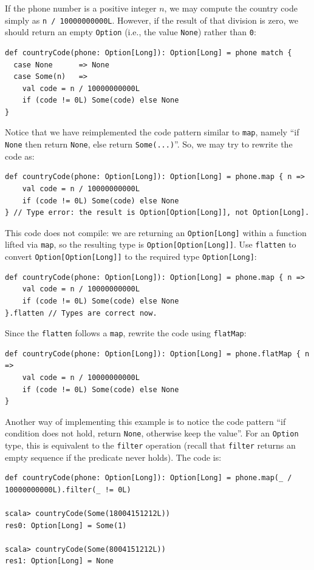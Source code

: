 If the phone number is a positive integer $n$, we may compute the
country code simply as \lstinline!n / 10000000000L!. However, if
the result of that division is zero, we should return an empty \lstinline!Option!
(i.e., the value \lstinline!None!) rather than \lstinline!0!:
\begin{lstlisting}
def countryCode(phone: Option[Long]): Option[Long] = phone match {
  case None      => None
  case Some(n)   =>
    val code = n / 10000000000L
    if (code != 0L) Some(code) else None 
}
\end{lstlisting}
Notice that we have reimplemented the code pattern similar to \lstinline!map!,
namely \textsf{``}if \lstinline!None! then return \lstinline!None!, else
return \lstinline!Some(...)!\textsf{''}. So, we may try to rewrite the code
as:
\begin{lstlisting}
def countryCode(phone: Option[Long]): Option[Long] = phone.map { n =>
    val code = n / 10000000000L
    if (code != 0L) Some(code) else None 
} // Type error: the result is Option[Option[Long]], not Option[Long].
\end{lstlisting}
This code does not compile: we are returning an \lstinline!Option[Long]!
within a function lifted via \lstinline!map!, so the resulting type
is \lstinline!Option[Option[Long]]!. Use \lstinline!flatten! to
convert \lstinline!Option[Option[Long]]! to the required type \lstinline!Option[Long]!:
\begin{lstlisting}
def countryCode(phone: Option[Long]): Option[Long] = phone.map { n =>
    val code = n / 10000000000L
    if (code != 0L) Some(code) else None 
}.flatten // Types are correct now.
\end{lstlisting}
Since the \lstinline!flatten! follows a \lstinline!map!, rewrite
the code using \lstinline!flatMap!:
\begin{lstlisting}
def countryCode(phone: Option[Long]): Option[Long] = phone.flatMap { n =>
    val code = n / 10000000000L
    if (code != 0L) Some(code) else None 
}
\end{lstlisting}

Another way of implementing this example is to notice the code pattern
\textsf{``}if condition does not hold, return \lstinline!None!, otherwise
keep the value\textsf{''}. For an \lstinline!Option! type, this is equivalent
to the \lstinline!filter! operation (recall that \lstinline!filter!
returns an empty sequence if the predicate never holds). The code
is:
\begin{lstlisting}
def countryCode(phone: Option[Long]): Option[Long] = phone.map(_ / 10000000000L).filter(_ != 0L)

scala> countryCode(Some(18004151212L))
res0: Option[Long] = Some(1)

scala> countryCode(Some(8004151212L))
res1: Option[Long] = None
\end{lstlisting}


